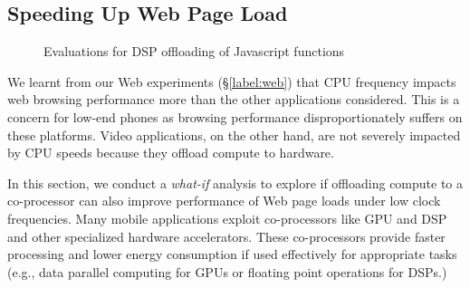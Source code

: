 
\subsection{Speeding Up Web Page Load} \label{label:whatif}

\begin{figure}[h]
\begin{center}
 \end{center}
 \begin{center}    
     \end{center}
      \begin{center}    
     \end{center}

   	\caption{Evaluations for DSP offloading of Javascript functions}
     \label{fig:dsp}
\end{figure}

We learnt from our Web experiments (\S\ref{label:web}) that 
CPU frequency impacts web browsing performance more
than the other applications considered. This is a concern
for low-end phones as browsing performance
disproportionately suffers on these platforms. Video applications, on the other hand, are not severely impacted by CPU speeds because they offload compute to hardware. 

In this section, we conduct a {\em what-if} analysis to explore if offloading compute to a co-processor can also improve performance of Web page loads under low clock frequencies. Many mobile applications exploit co-processors like GPU and DSP and other specialized hardware accelerators. These co-processors provide faster processing and lower energy consumption if used effectively for appropriate
tasks (e.g., data parallel computing
for GPUs or floating point operations for DSPs.)
 
